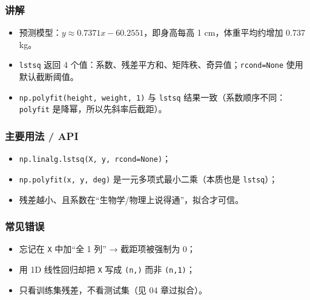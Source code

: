 \begin{Shaded}
\begin{Highlighting}[]
\end{Highlighting}
\end{Shaded}

\subsubsection{讲解}\label{ux8bb2ux89e3-7}

\begin{itemize}
\tightlist
\item
  预测模型：\(y \approx 0.7371 x - 60.2551\)，即身高每高 1
  cm，体重平均约增加 0.737 kg。
\item
  \texttt{lstsq} 返回 4
  个值：系数、残差平方和、矩阵秩、奇异值；\texttt{rcond=None}
  使用默认截断阈值。
\item
  \texttt{np.polyfit(height,\ weight,\ 1)} 与 \texttt{lstsq}
  结果一致（系数顺序不同：\texttt{polyfit} 是降幂，所以先斜率后截距）。
\end{itemize}

\subsubsection{主要用法 / API}\label{ux4e3bux8981ux7528ux6cd5-api-7}

\begin{itemize}
\tightlist
\item
  \texttt{np.linalg.lstsq(X,\ y,\ rcond=None)}；
\item
  \texttt{np.polyfit(x,\ y,\ deg)} 是一元多项式最小二乘（本质也是
  \texttt{lstsq}）；
\item
  残差越小、且系数在``生物学/物理上说得通''，拟合才可信。
\end{itemize}

\subsubsection{常见错误}\label{ux5e38ux89c1ux9519ux8bef-7}

\begin{itemize}
\tightlist
\item
  忘记在 \texttt{X} 中加``全 1 列'' → 截距项被强制为 0；
\item
  用 1D 线性回归却把 \texttt{X} 写成 \texttt{(n,)} 而非 \texttt{(n,1)}；
\item
  只看训练集残差，不看测试集（见 04 章过拟合）。
\end{itemize}

